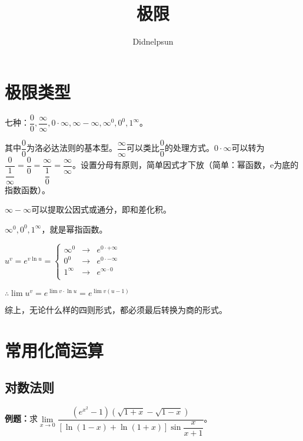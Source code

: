 \documentclass[UTF8, 12pt]{ctexart}
\author{Didnelpsun}
\title{极限}
\date{}
\begin{document}
\maketitle
\thispagestyle{empty}
\tableofcontents
\thispagestyle{empty}
\newpage
\pagestyle{plain}
\setcounter{page}{1}

\section{极限类型}

七种：$\dfrac{0}{0},\dfrac{\infty}{\infty},0\cdot\infty,\infty-\infty,\infty^0,0^0,1^\infty$。

\medskip

其中$\dfrac{0}{0}$为洛必达法则的基本型。$\dfrac{\infty}{\infty}$可以类比$\dfrac{0}{0}$的处理方式。$0\cdot\infty$可以转为$\dfrac{0}{\dfrac{1}{\infty}}=\dfrac{0}{0}=\dfrac{\infty}{\dfrac{1}{0}}=\dfrac{\infty}{\infty}$。设置分母有原则，简单因式才下放（简单：幂函数，e为底的指数函数）。 

\medskip

$\infty-\infty$可以提取公因式或通分，即和差化积。

\medskip

$\infty^0,0^0,1^\infty$，就是幂指函数。

\medskip

$
u^v=e^{v\ln u}=\left\{
\begin{array}{lcl}
    \infty^0 & \rightarrow & e^{0\cdot+\infty} \\
    0^0 & \rightarrow & e^{0\cdot-\infty} \\
    1^\infty & \rightarrow & e^{\infty\cdot 0} \\
\end{array} \right.
$

\medskip

$\therefore \lim u^v=e^{\lim v\cdot\ln u}=e^{\lim v(u-1)}$

综上，无论什么样的四则形式，都必须最后转换为商的形式。

\section{常用化简运算}

\subsection{对数法则}

\textbf{例题：}求$\lim\limits_{x\to 0}\dfrac{(e^{x^2}-1)(\sqrt{1+x}-\sqrt{1-x})}{[\ln(1-x)+\ln(1+x)]\sin\dfrac{x}{x+1}}$。
\end{document}

